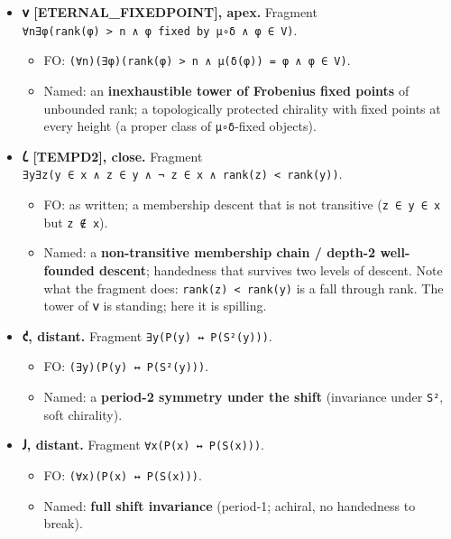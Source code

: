 \begin{itemize}
\tightlist
\item
  \textbf{𐑫 {[}ETERNAL\_FIXEDPOINT{]}, apex.} Fragment
  \texttt{∀n∃φ(rank(φ)\ \textgreater{}\ n\ ∧\ φ\ fixed\ by\ μ∘δ\ ∧\ φ\ ∈\ V)}.

  \begin{itemize}
  \tightlist
  \item
    FO:
    \texttt{(∀n)(∃φ)(rank(φ)\ \textgreater{}\ n\ ∧\ μ(δ(φ))\ =\ φ\ ∧\ φ\ ∈\ V)}.
  \item
    Named: an \textbf{inexhaustible tower of Frobenius fixed points} of
    unbounded rank; a topologically protected chirality with fixed
    points at every height (a proper class of \texttt{μ∘δ}-fixed
    objects).
  \end{itemize}
\item
  \textbf{𐑖 {[}TEMPD2{]}, close.} Fragment
  \texttt{∃y∃z(y\ ∈\ x\ ∧\ z\ ∈\ y\ ∧\ ¬\ z\ ∈\ x\ ∧\ rank(z)\ \textless{}\ rank(y))}.

  \begin{itemize}
  \tightlist
  \item
    FO: as written; a membership descent that is not transitive
    (\texttt{z\ ∈\ y\ ∈\ x} but \texttt{z\ ∉\ x}).
  \item
    Named: a \textbf{non-transitive membership chain / depth-2
    well-founded descent}; handedness that survives two levels of
    descent. Note what the fragment does:
    \texttt{rank(z)\ \textless{}\ rank(y)} is a fall through rank. The
    tower of 𐑫 is standing; here it is spilling.
  \end{itemize}
\item
  \textbf{𐑒, distant.} Fragment \texttt{∃y(P(y)\ ↔\ P(S²(y)))}.

  \begin{itemize}
  \tightlist
  \item
    FO: \texttt{(∃y)(P(y)\ ↔\ P(S²(y)))}.
  \item
    Named: a \textbf{period-2 symmetry under the shift} (invariance
    under \texttt{S²}, soft chirality).
  \end{itemize}
\item
  \textbf{𐑓, distant.} Fragment \texttt{∀x(P(x)\ ↔\ P(S(x)))}.

  \begin{itemize}
  \tightlist
  \item
    FO: \texttt{(∀x)(P(x)\ ↔\ P(S(x)))}.
  \item
    Named: \textbf{full shift invariance} (period-1; achiral, no
    handedness to break).
  \end{itemize}
\end{itemize}

